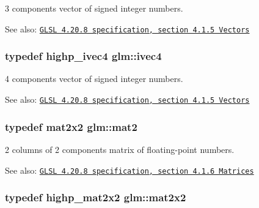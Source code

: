 3 components vector of signed integer numbers.

\begin{Desc}
\item[See also:]\href{http://www.opengl.org/registry/doc/GLSLangSpec.4.20.8.pdf}{\tt GLSL 4.20.8 specification, section 4.1.5 Vectors} \end{Desc}
\hypertarget{group__core__types_ga4560ddc50320ea8f8a70d5c9c249fea}{
\subsubsection[ivec4]{\setlength{\rightskip}{0pt plus 5cm}typedef highp\_\-ivec4 {\bf glm::ivec4}}}
\label{group__core__types_ga4560ddc50320ea8f8a70d5c9c249fea}


4 components vector of signed integer numbers.

\begin{Desc}
\item[See also:]\href{http://www.opengl.org/registry/doc/GLSLangSpec.4.20.8.pdf}{\tt GLSL 4.20.8 specification, section 4.1.5 Vectors} \end{Desc}
\hypertarget{group__core__types_g8357ec0aab6f8cf69313592492663c3f}{
\subsubsection[mat2]{\setlength{\rightskip}{0pt plus 5cm}typedef mat2x2 {\bf glm::mat2}}}
\label{group__core__types_g8357ec0aab6f8cf69313592492663c3f}


2 columns of 2 components matrix of floating-point numbers.

\begin{Desc}
\item[See also:]\href{http://www.opengl.org/registry/doc/GLSLangSpec.4.20.8.pdf}{\tt GLSL 4.20.8 specification, section 4.1.6 Matrices} \end{Desc}
\hypertarget{group__core__types_geddc14adb4963d9bad73866cc202fb40}{
\subsubsection[mat2x2]{\setlength{\rightskip}{0pt plus 5cm}typedef highp\_\-mat2x2 {\bf glm::mat2x2}}}
\label{group__core__types_geddc14adb4963d9bad73866cc202fb40}


